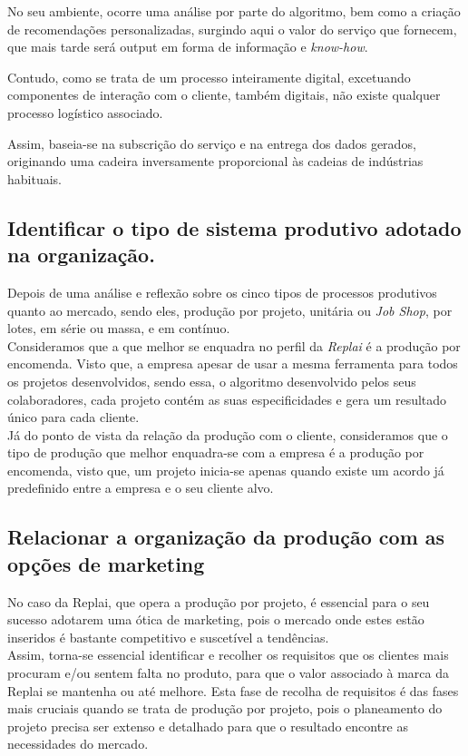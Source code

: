 No seu ambiente, ocorre uma análise por parte do algoritmo, bem como a criação de recomendações personalizadas, surgindo aqui o valor do serviço que fornecem, que mais tarde será output em forma de informação e \textit{know-how}. 

Contudo, como se trata de um processo inteiramente digital, excetuando componentes de interação com o cliente, também digitais, não existe qualquer processo logístico associado.

Assim, baseia-se na subscrição do serviço e na entrega dos dados gerados, originando uma cadeira inversamente proporcional às cadeias de indústrias habituais.

\subsection{Identificar o tipo de sistema produtivo adotado na organização.}

Depois de uma análise e reflexão sobre os cinco tipos de processos produtivos quanto ao mercado, sendo eles, produção por projeto, unitária ou \textit{Job Shop}, por lotes, em série ou massa, e em contínuo. \\

Consideramos que a que melhor se enquadra no perfil da \textit{Replai} é a produção por encomenda. Visto que, a empresa apesar de usar a mesma ferramenta para todos os projetos desenvolvidos, sendo essa, o algoritmo desenvolvido pelos seus colaboradores, cada projeto contém as suas especificidades e gera um resultado único para cada cliente. \\

Já do ponto de vista da relação da produção com o cliente, consideramos que o tipo de produção que melhor enquadra-se com a empresa é a produção por encomenda, visto que, um projeto inicia-se apenas quando existe um acordo já predefinido entre a empresa e o seu cliente alvo. \\

\subsection{Relacionar a organização da produção com as opções de marketing }
No caso da Replai, que opera a produção por projeto, é essencial para o seu sucesso adotarem uma ótica de marketing, pois o mercado onde estes estão inseridos é bastante competitivo e suscetível a tendências. \\

Assim, torna-se essencial identificar e recolher os requisitos que os clientes mais procuram e/ou sentem falta no produto, para que o valor associado à marca da Replai se mantenha ou até melhore. Esta fase de recolha de requisitos é das fases mais cruciais quando se trata de produção por projeto, pois o planeamento do projeto precisa ser extenso e detalhado para que o resultado encontre as necessidades do mercado. 

